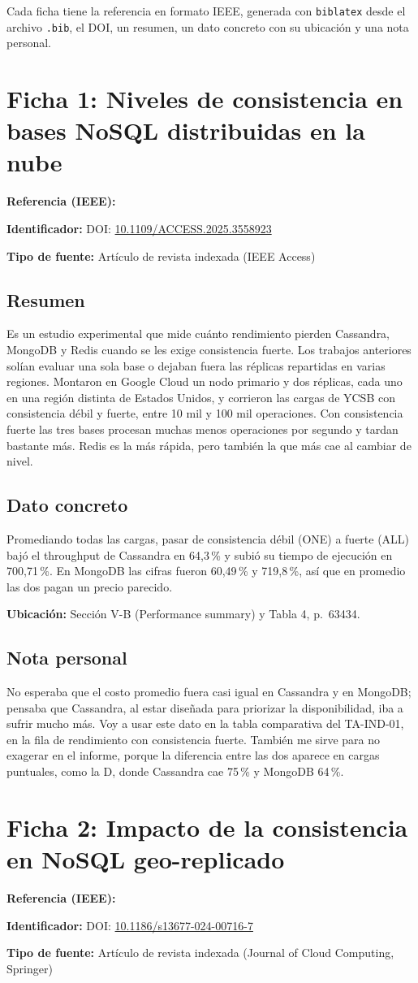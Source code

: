 \documentclass[11pt,a4paper]{article}
\newcommand{\campo}[2]{\noindent\textbf{#1:} #2\par\smallskip}
\newcommand{\ficha}[1]{\section*{#1}}
\newcommand{\parte}[1]{\subsection*{#1}}
\begin{document}
Cada ficha tiene la referencia en formato IEEE, generada con \texttt{biblatex} desde el archivo
\texttt{.bib}, el DOI, un resumen, un dato concreto con su ubicación y una nota personal.

\clearpage

\ficha{Ficha 1: Niveles de consistencia en bases NoSQL distribuidas en la nube}

\campo{Referencia (IEEE)}{}
\campo{Identificador}{DOI: \href{https://doi.org/10.1109/ACCESS.2025.3558923}{10.1109/ACCESS.2025.3558923}}
\campo{Tipo de fuente}{Artículo de revista indexada (IEEE Access)}

\parte{Resumen}
Es un estudio experimental que mide cuánto rendimiento pierden Cassandra, MongoDB y
Redis cuando se les exige consistencia fuerte. Los trabajos anteriores solían evaluar una
sola base o dejaban fuera las réplicas repartidas en varias regiones. Montaron en Google
Cloud un nodo primario y dos réplicas, cada uno en una región distinta de Estados Unidos,
y corrieron las cargas de YCSB con consistencia débil y fuerte, entre 10 mil y 100 mil
operaciones. Con consistencia fuerte las tres bases procesan muchas menos operaciones por
segundo y tardan bastante más. Redis es la más rápida, pero también la que más cae al
cambiar de nivel.

\parte{Dato concreto}
Promediando todas las cargas, pasar de consistencia débil (ONE) a fuerte (ALL) bajó el
throughput de Cassandra en 64,3\,\% y subió su tiempo de ejecución en 700,71\,\%. En
MongoDB las cifras fueron 60,49\,\% y 719,8\,\%, así que en promedio las dos pagan un precio
parecido.

\campo{Ubicación}{Sección V-B (Performance summary) y Tabla 4, p.~63434.}

\parte{Nota personal}
No esperaba que el costo promedio fuera casi igual en Cassandra y en MongoDB; pensaba
que Cassandra, al estar diseñada para priorizar la disponibilidad, iba a sufrir mucho más.
Voy a usar este dato en la tabla comparativa del TA-IND-01, en la fila de rendimiento con
consistencia fuerte. También me sirve para no exagerar en el informe, porque la diferencia
entre las dos aparece en cargas puntuales, como la D, donde Cassandra cae 75\,\% y
MongoDB 64\,\%.

\ficha{Ficha 2: Impacto de la consistencia en NoSQL geo-replicado}

\campo{Referencia (IEEE)}{}
\campo{Identificador}{DOI: \href{https://doi.org/10.1186/s13677-024-00716-7}{10.1186/s13677-024-00716-7}}
\campo{Tipo de fuente}{Artículo de revista indexada (Journal of Cloud Computing, Springer)}
\end{document}
